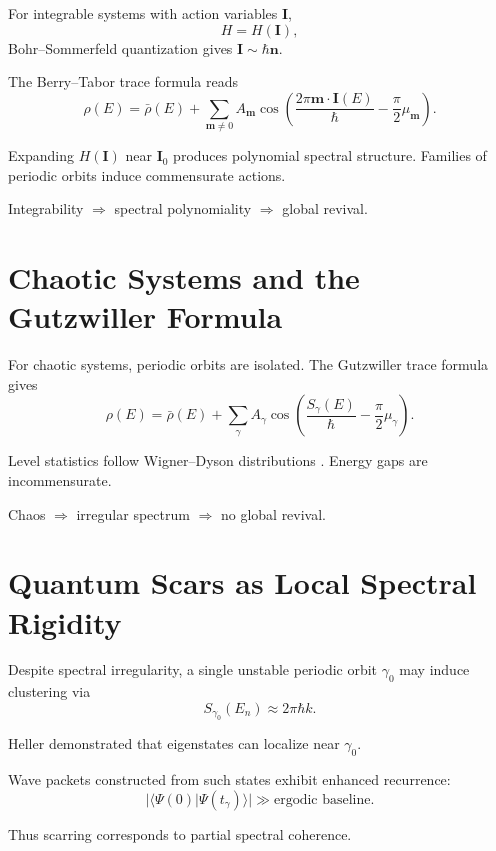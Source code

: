 \documentclass[11pt]{article}
\begin{document}
For integrable systems with action variables $\mathbf{I}$,
\[
H = H(\mathbf{I}),
\]
Bohr--Sommerfeld quantization gives $\mathbf{I}\sim\hbar\mathbf{n}$.

The Berry--Tabor trace formula \cite{BerryTabor1976} reads
\[
\rho(E)
=
\bar{\rho}(E)
+
\sum_{\mathbf{m}\neq0}
A_{\mathbf{m}}
\cos\!\left(
\frac{2\pi \mathbf{m}\cdot \mathbf{I}(E)}{\hbar}
-
\frac{\pi}{2}\mu_{\mathbf{m}}
\right).
\]

Expanding $H(\mathbf{I})$ near $\mathbf{I}_0$ produces polynomial spectral structure.
Families of periodic orbits induce commensurate actions.

\begin{center}
Integrability $\Rightarrow$ spectral polynomiality $\Rightarrow$ global revival.
\end{center}

\section{Chaotic Systems and the Gutzwiller Formula}

For chaotic systems, periodic orbits are isolated.
The Gutzwiller trace formula \cite{Gutzwiller1971} gives
\[
\rho(E)
=
\bar{\rho}(E)
+
\sum_\gamma
A_\gamma
\cos\!\left(
\frac{S_\gamma(E)}{\hbar}
-
\frac{\pi}{2}\mu_\gamma
\right).
\]

Level statistics follow Wigner--Dyson distributions \cite{BGS1984}.
Energy gaps are incommensurate.

\begin{center}
Chaos $\Rightarrow$ irregular spectrum $\Rightarrow$ no global revival.
\end{center}

\section{Quantum Scars as Local Spectral Rigidity}

Despite spectral irregularity,
a single unstable periodic orbit $\gamma_0$ may induce clustering via
\[
S_{\gamma_0}(E_n)\approx 2\pi\hbar k.
\]

Heller \cite{Heller1984} demonstrated that eigenstates can localize near $\gamma_0$.

Wave packets constructed from such states exhibit enhanced recurrence:
\[
|\langle \Psi(0) | \Psi(t_\gamma) \rangle| \gg \text{ergodic baseline}.
\]

Thus scarring corresponds to partial spectral coherence.
\end{document}
